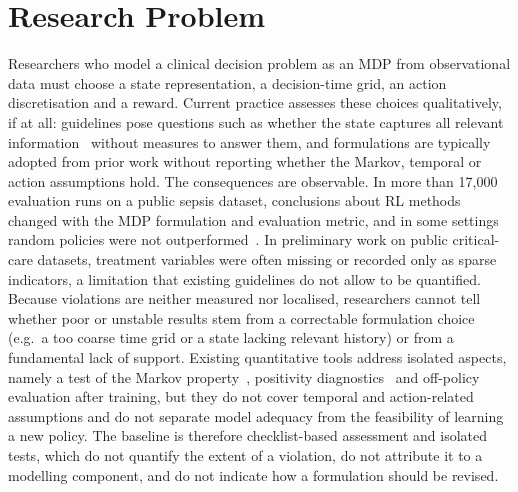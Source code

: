 \documentclass[runningheads]{llncs}
\begin{document}
\section{Research Problem}
Researchers who model a clinical decision problem as an MDP from observational data must choose a state representation, a decision-time grid, an action discretisation and a reward. Current practice assesses these choices qualitatively, if at all: guidelines pose questions such as whether the state captures all relevant information~\cite{Gottesman2019} without measures to answer them, and formulations are typically adopted from prior work without reporting whether the Markov, temporal or action assumptions hold. The consequences are observable. In more than 17,000 evaluation runs on a public sepsis dataset, conclusions about RL methods changed with the MDP formulation and evaluation metric, and in some settings random policies were not outperformed~\cite{Luo2024}. In preliminary work on public critical-care datasets, treatment variables were often missing or recorded only as sparse indicators, a limitation that existing guidelines do not allow to be quantified. Because violations are neither measured nor localised, researchers cannot tell whether poor or unstable results stem from a correctable formulation choice (e.g.\ a too coarse time grid or a state lacking relevant history) or from a fundamental lack of support. Existing quantitative tools address isolated aspects, namely a test of the Markov property~\cite{Shi2020}, positivity diagnostics~\cite{Petersen2012} and off-policy evaluation after training, but they do not cover temporal and action-related assumptions and do not separate model adequacy from the feasibility of learning a new policy. The baseline is therefore checklist-based assessment and isolated tests, which do not quantify the extent of a violation, do not attribute it to a modelling component, and do not indicate how a formulation should be revised.
\end{document}
